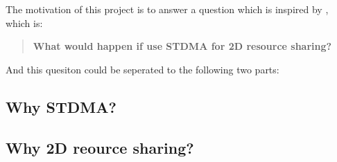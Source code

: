 The motivation of this project is to answer a question which is inspired by \cite{Paper_From_Supervisor}, which is:

\begin{quote}
    \textbf{What would happen if use STDMA for 2D resource sharing?}
\end{quote}

And this quesiton could be seperated to the following two parts:

\subsection{Why STDMA?}
\subsection{Why 2D reource sharing?}
